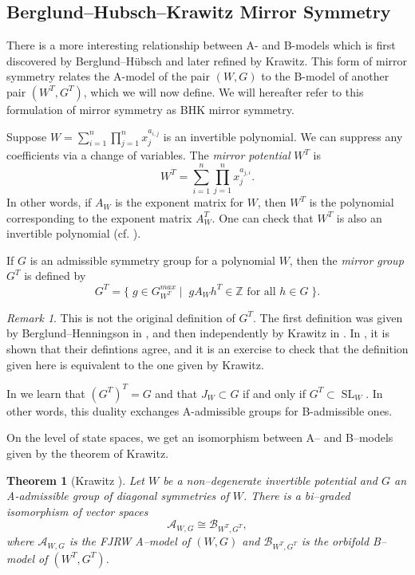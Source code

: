 \documentclass[10pt, letterpaper]{amsart}
\newtheorem{thm}{Theorem}%
\theoremstyle{remark}
\newtheorem{rem}{Remark}[thm]
\newcommand{\ZZ}{\mathbb{Z}}
\newcommand{\sA}{\mathscr{A}}
\newcommand{\sB}{\mathscr{B}}
\newcommand{\set}[1]{\{#1\}}
\newcommand{\defital}{\textit}
\DeclareMathOperator{\SL}{SL}
\begin{document}
\subsection{Berglund--Hubsch--Krawitz Mirror Symmetry}\label{sec:BHK}
There is a more interesting relationship between A- and B-models which is first discovered by Berglund--H\"ubsch and later refined by Krawitz. This form of mirror symmetry relates the A-model of the pair $(W,G)$ to the B-model of another pair $(W^T, G^T)$, which we will now define. We will hereafter refer to this formulation of mirror symmetry as BHK mirror symmetry.  

Suppose $W=\sum_{i=1}^n  \prod_{j=1}^n x_j^{a_{i,j}}$ is an invertible polynomial. We can suppress any coefficients via a change of variables. The \defital{mirror potential} $W^T$ is 
\[
W^T = \sum_{i=1}^n  \prod_{j=1}^n x_j^{a_{j,i}}. 
\]
In other words, if $A_W$ is the exponent matrix for $W$, then $W^T$ is the polynomial corresponding to the exponent matrix $A_W^T$. One can check that $W^T$ is also an invertible polynomial (cf. \cite{ChR1}). 
 
If $G$ is an admissible symmetry group for a polynomial $W$, then the \defital{mirror group} $G^T$ is defined by 
\[
G^T = \set{\; g \in G_{W^T}^{max} \; | \;\;g A_{W} h^T \in \ZZ \text{ for all } h \in G \; }.
\]
\begin{rem}
This is not the original definition of $G^T$. The first definition was given by Berglund--Henningson in \cite{BHen}, and then independently by Krawitz in \cite{Kr}. In \cite{involutions}, it is shown that their defintions agree, and it is an exercise to check that the definition given here is equivalent to the one given by Krawitz. 
\end{rem}


In \cite[Proposition 3]{involutions} we learn that $(G^T)^T = G$ and that $J_W\subset G$ if and only if $G^T\subset \SL_W$. In other words, this duality exchanges A-admissible groups for B-admissible ones. 

On the level of state spaces, we get an isomorphism between A-- and B--models given by the theorem of Krawitz.

\begin{thm}[Krawitz \cite{Kr}]\label{t:krawitz}
Let $W$ be a non--degenerate invertible potential and $G$ an A-admissible group of diagonal symmetries of $W$.
There is a bi--graded isomorphism of vector spaces
\[\sA_{W,G} \cong \sB_{W^T ,G^T} ,\]
where $\sA_{W,G}$ is the FJRW A--model of $(W, G)$ and $\sB_{W^T ,G^T}$ is the orbifold B--model of $(W^T
, G^T)$.
\end{thm}
\end{document}

